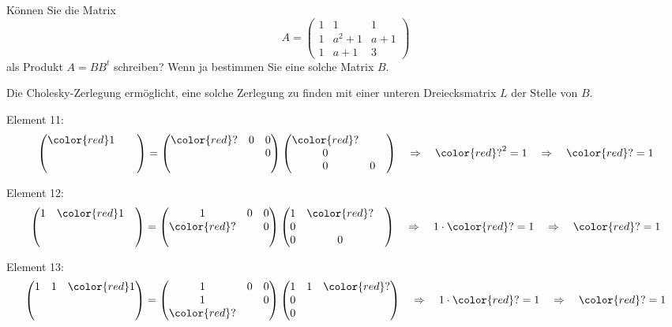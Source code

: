 Können Sie die Matrix 
\[
A
=
\begin{pmatrix}
  1&    1&1\\
  1&a^2+1&a+1\\
  1&a  +1&3
\end{pmatrix}
\]
als Produkt $A=BB^t$ schreiben?
Wenn ja bestimmen Sie eine solche Matrix $B$.


\begin{loesung}
Die Cholesky-Zerlegung ermöglicht, eine solche Zerlegung zu finden mit
einer unteren Dreiecksmatrix $L$ der Stelle von $B$.

Element 11:
\[
\begin{pmatrix}
\color{red}1&&\\
 &&\\
 &&
\end{pmatrix}
=
\begin{pmatrix}
{\color{red}?}&0&0\\
 & &0\\
 & &
\end{pmatrix}
\begin{pmatrix}
{\color{red}?}& & \\
0& & \\
0&0&
\end{pmatrix}
\quad\Rightarrow\quad
{\color{red}?}^2 = 1
\quad\Rightarrow\quad
{\color{red}?}=1
\]

Element 12:
\[
\begin{pmatrix}
1 & \color{red}1 & \\
  &              & \\
  &              &
\end{pmatrix}
=
\begin{pmatrix}
1           & 0 & 0\\
\color{red}?&   & 0\\
            &   &  
\end{pmatrix}
\begin{pmatrix}
1 &\color{red}? &  \\
0 &             &  \\
0 &           0 &  
\end{pmatrix}
\quad\Rightarrow\quad
1\cdot{\color{red}?} = 1
\quad\Rightarrow\quad
{\color{red}?} = 1
\]

Element 13:
\[
\begin{pmatrix}
1 & 1 & \color{red}1\\
  &   &             \\
  &   &
\end{pmatrix}
=
\begin{pmatrix}
1           & 0 & 0\\
1           &   & 0\\
\color{red}?&   &
\end{pmatrix}
\begin{pmatrix}
1 & 1 & \color{red}? \\
0 &   &              \\
0 &   &  
\end{pmatrix}
\quad\Rightarrow\quad
1\cdot{\color{red}?} = 1
\quad\Rightarrow\quad
{\color{red}?} = 1
\]


\end{loesung}
